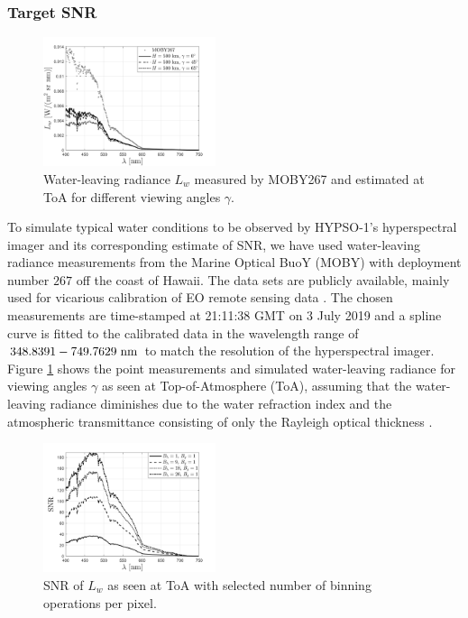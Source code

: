 \subsubsection{Target SNR}
\begin{figure}[htbp]
  \centering
      \includegraphics[width=0.45\textwidth]{figs/radiance.png}
  \caption{Water-leaving radiance $L_w$ measured by MOBY267 and estimated at ToA for different viewing angles $\gamma$.}
	\label{fig:signal}
\end{figure}
To simulate typical water conditions to be observed by HYPSO-1's hyperspectral imager and its corresponding estimate of SNR, we have used water-leaving radiance measurements from the Marine Optical BuoY (MOBY) with deployment number $267$ off the coast of Hawaii. The data sets are publicly available, mainly used for vicarious calibration of EO remote sensing data \cite{Clark2002}. The chosen measurements are time-stamped at 21:11:38 GMT on 3 July 2019 and a spline curve is fitted to the calibrated data in the wavelength range of $348.8391-749.7629 \hspace{3pt} \rm{nm}$ to match the resolution of the hyperspectral imager. Figure \ref{fig:signal} shows the point measurements and simulated water-leaving radiance for viewing angles $\gamma$ as seen at Top-of-Atmosphere (ToA), assuming that the water-leaving radiance diminishes due to the water refraction index and the atmospheric transmittance consisting of only the Rayleigh optical thickness \cite{Bucholtz1995}. 
\begin{figure}[htbp]
  \centering
      \includegraphics[width=0.45\textwidth]{figs/snr.png}
  \caption{SNR of $L_w$ as seen at ToA with selected number of binning operations per pixel.}
	\label{fig:fred_snr2}
\end{figure}

